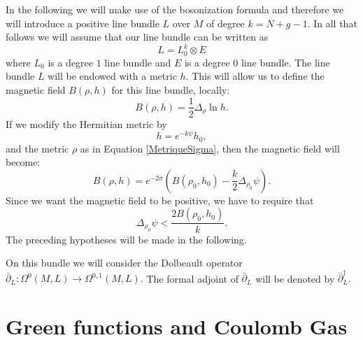 \documentclass{article}
\theoremstyle{definition}
\theoremstyle{remark}
\begin{document}
In the following we will make use of the bosonization formula and therefore we will introduce a positive line bundle $L$ over $M$ of degree $k=N+g-1.$ In all that follows we will assume that our line bundle can be written as $$L=L_{0}^{k}\otimes E$$ where $L_{0}$ is a degree $1$ line bundle and $E$ is a degree $0$ line bundle. The line bundle $L$ will be endowed with a metric $h.$ This will allow us to define the magnetic field $B(\rho,h)$ for this line bundle, locally: $$B(\rho,h)=\frac{1}{2}\Delta_{\rho} \ln h.$$
If we modify the Hermitian metric by \begin{equation}\label{MetriqueHermPsi}h=e^{-k\psi}h_{0},\end{equation} and the metric $\rho$ as in Equation \eqref{MetriqueSigma}, then the magnetic field will become: \begin{equation}\label{ModifMag}
B(\rho,h)=e^{-2\sigma}\left(B(\rho_{0},h_{0}) -\frac{k}{2}\Delta_{\rho_{0}}\psi\right).
\end{equation} 
Since we want the magnetic field to be positive, we have to require that \begin{equation}\label{eq:CondMagPos}
\Delta_{\rho_{0}}\psi <\frac{2B(\rho_{0},h_{0})}{k}.\end{equation}
The preceding hypotheses will be made in the following.

On this bundle we will consider the Dolbeault operator $\bar{\partial}_{L}: \Omega^{0}(M,L) \to \Omega^{0,1}(M,L).$ The formal adjoint of $\bar{\partial}_{L}$ will be denoted by $\bar{\partial}^{\dagger}_{L}.$

\section{Green functions and Coulomb Gas}\label{SectionGreen}
\end{document}
